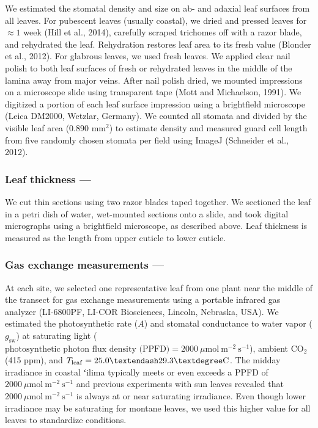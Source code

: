 \documentclass[
  letterpaper,
  DIV=11,
  numbers=noendperiod]{scrartcl}
\begin{document}
We estimated the stomatal density and size on ab- and adaxial leaf
surfaces from all leaves. For pubescent leaves (usually coastal), we
dried and pressed leaves for \(\approx 1\) week (Hill et al., 2014),
carefully scraped trichomes off with a razor blade, and rehydrated the
leaf. Rehydration restores leaf area to its fresh value (Blonder et al.,
2012). For glabrous leaves, we used fresh leaves. We applied clear nail
polish to both leaf surfaces of fresh or rehydrated leaves in the middle
of the lamina away from major veins. After nail polish dried, we mounted
impressions on a microscope slide using transparent tape (Mott and
Michaelson, 1991). We digitized a portion of each leaf surface
impression using a brightfield microscope (Leica DM2000, Wetzlar,
Germany). We counted all stomata and divided by the visible leaf area
(0.890 mm\(^2\)) to estimate density and measured guard cell length from
five randomly chosen stomata per field using ImageJ (Schneider et al.,
2012).

\hypertarget{leaf-thickness}{%
\subsubsection{Leaf thickness ---}\label{leaf-thickness}}

We cut thin sections using two razor blades taped together. We sectioned
the leaf in a petri dish of water, wet-mounted sections onto a slide,
and took digital micrographs using a brightfield microscope, as
described above. Leaf thickness is measured as the length from upper
cuticle to lower cuticle.

\hypertarget{gas-exchange-measurements}{%
\subsubsection{Gas exchange measurements
---}\label{gas-exchange-measurements}}

At each site, we selected one representative leaf from one plant near
the middle of the transect for gas exchange measurements using a
portable infrared gas analyzer (LI-6800PF, LI-COR Biosciences, Lincoln,
Nebraska, USA). We estimated the photosynthetic rate (\(A\)) and
stomatal conductance to water vapor (\(g_\text{sw}\)) at saturating
light
(\(\text{photosynthetic photon flux density (PPFD)} = 2000~\mu \text{mol}~\text{m}^{-2}~\text{s}^{-1}\)),
ambient CO\(_2\) (415 ppm), and
\(T_\mathrm{leaf} = 25.0 \textendash 29.3° \text{C}\). The midday
irradiance in coastal ʻilima typically meets or even exceeds a PPFD of
\(2000~\mu \text{mol}~\text{m}^{-2}~\text{s}^{-1}\) and previous
experiments with sun leaves revealed that
\(2000~\mu \text{mol}~\text{m}^{-2}~\text{s}^{-1}\) is always at or near
saturating irradiance. Even though lower irradiance may be saturating
for montane leaves, we used this higher value for all leaves to
standardize conditions.
\end{document}
